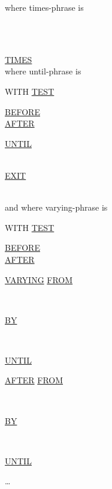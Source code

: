 \documentclass[a4paper,oneside,svgnames]{scrbook}
\makeatletter
\newcommand{\key}[1]{\underline{#1}}
\newcommand{\gnucobol}[1]{%
  \colorbox{orange!75}{#1}}
\newenvironment{0-1}{$\left[ \begin{tabular}{@{}l@{}}}{\end{tabular} \right]$}
\newenvironment{1=}{$\left\{ \begin{tabular}{@{}l@{}}}{\end{tabular} \right\}$}
\makeatother
\begin{document}
where times-phrase is

\begin{1=}
  \identifier \\
  \literal \\
  \functionname
\end{1=}
\key{TIMES} \\

where until-phrase is

\begin{0-1}
  WITH \key{TEST}
  \begin{1=}
    \key{BEFORE} \\
    \key{AFTER} \\
  \end{1=}
\end{0-1}
\key{UNTIL}
\begin{1=}
  \condition \\
  \gnucobol{\key{EXIT}}
\end{1=} \\

and where varying-phrase is

\begin{0-1}
  WITH \key{TEST}
  \begin{1=}
    \key{BEFORE} \\
    \key{AFTER} \\
  \end{1=}
\end{0-1}

\key{VARYING} \identifier \key{FROM}
\begin{1=}
  \identifier \\
  \literal
\end{1=}
\key{BY}
\begin{1=}
  \identifier \\
  \literal
\end{1=}
\key{UNTIL}
\condition

\begin{0-1}
  \key{AFTER} \identifier \key{FROM}
  \begin{1=}
    \identifier \\
    \literal
  \end{1=}
  \key{BY}
  \begin{1=}
    \identifier \\
    \literal
  \end{1=}

  \key{UNTIL}
  \condition
\end{0-1} \ldots


\end{document}
